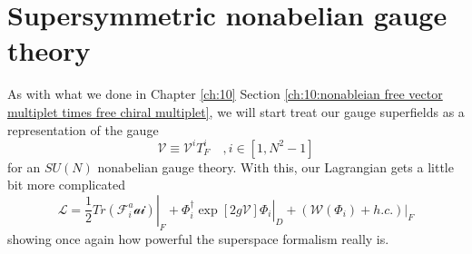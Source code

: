 \section{Supersymmetric nonabelian gauge theory}
\label{ch:13: supersymmetric nonabelian gauge theory}
As with what we done in Chapter \ref{ch:10} Section \ref{ch:10:nonableian free vector multiplet times free chiral multiplet}, we will start treat our gauge superfields as a representation of the gauge
\begin{equation}
    \mathcal{V} \equiv \mathcal{V}^i T_F^i \quad , i \in [1, N^2-1]
\end{equation}
for an $SU(N)$ nonabelian gauge theory.
With this, our Lagrangian gets a little bit more complicated
\begin{equation}
    \mathcal{L} = \left.\frac{1}{2} Tr(\mathcal{F}^a_i \mathcal{ai}) \right\vert_F + \left. \Phi_i^\dagger \exp[2g\mathcal{V}]\Phi_i\right\vert_D + \left.(\mathcal{W}(\Phi_i) + h.c. )\right\vert_F
\end{equation}
showing once again how powerful the superspace formalism really is.